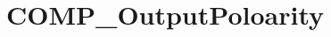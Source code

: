 \hypertarget{group___c_o_m_p___output_poloarity}{\section{C\-O\-M\-P\-\_\-\-Output\-Poloarity}
\label{group___c_o_m_p___output_poloarity}
}
